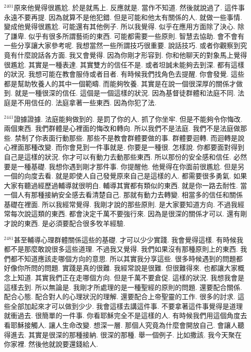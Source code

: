 \documentclass{book}
\begin{document}
$^{2401}$原來他覺得很尷尬.
於是就馬上.
反應就是.
當作不知道.
然後就說過了.
這件事永遠不要再提.
因為就算不是他犯錯.
但是可能和他太有關係的人.
就做一些事情.
變成他覺得很尷尬.
可能還有其他例子.
所以我覺得.
似乎在應用方面除了決心.
除了謙卑.
似乎有很多所謂藝術的東西.
可能都需要一些原則.
智慧去協助.
會不會有一些分享讓大家參考呢.
我想當然一些所謂技巧很重要.
說話技巧.
或者你觀察到究竟有什麼說話各方面.
我又會覺得.
因為你剛才形容到.
你和他聊天的對象馬上覺得很尷尬.
其實是一種表達.
其實雙方的信任不是.
或者坦誠未能夠去到深.
都有這樣的狀況.
我想可能在教會服侍或者目者.
有時候我們找角色去提醒.
你會發覺.
這些都是幫助牧養人的其中一個範疇.
而能夠牧養.
其實是在說一個很深厚的關係才做到.
就是一種很深的信任.
這個是一個這樣的狀況.
因為基督徒群體和法庭不同.
法庭是不用信任的.
法庭拿著一些東西.
因為你犯了法.

$^{2441}$證據證據.
法庭能夠做到的.
是罰了你的人.
抓了你坐牢.
但是不能夠令你悔改.
兩個東西.
我們群體是心裡面的悔改和轉向.
所以我們不是法庭.
我們不是法庭做那些.
禁制了你表面行動那些.
那些不是教會群體要做的事.
群體要迴轉.
而迴轉是說心裡面那種改變.
而你會見到一件事就是.
你要是一種很.
怎樣說.
你都要面對得到自己是這樣的狀況.
你才可以有動力去動那些東西.
所以那份的安全感和信任.
必然要是一種基礎.
我想你遇到剛才那件事.
你提醒他.
他覺得在你面前很尷尬.
但是另一個的向度去看.
就是即使人自己發覺原來自己是這樣的人.
都需要很多勇氣.
如果大家有聽過經歷過輔導就很明白.
輔導其實都有類似的東西.
就是你一路去耐性.
當一個人有那種接納安全感去看清楚自己.
那就有動力去轉變.
相當多的信任和關係基礎在裡面.
所以我經常覺得.
我剛才說的那些原則.
是大家要知道方向.
不過我經常每次說這類的東西.
都會決定千萬不要強行來.
因為是很深的關係才可以.
還有剛才說的東西.
是必須要配合很多牧羊經驗.

$^{2481}$甚至輔導心理群體關係這些的基礎.
才可以少少實踐.
我會覺得這樣.
有時候我都不是那麼敢說很多這些道理.
不過我又覺得.
我們如果沒有那種原則上的東西.
我們都不知道應該走哪個方向的意思.
所以其實我分享這些.
很多時候遇到的問題都好像你所問的問題.
實踐是真的很難.
我經常說是很難.
但很難得來.
也都讓大家概念上知道.
其實我們正在走哪個方向.
但是千萬不要倉促.
這樣的狀況.
我想我會是這樣去到.
所以無論是.
我剛才所處理的是一種聖經的原則的問題.
還要配合關係.
配合心態.
配合對人的心理狀況的理解.
還要配合上帝聖靈的工作.
很多的討求.
這些全部加起來才可以做到少少.
我會這樣去講這件事.
不要拿著這件事覺得是道理就衝過去.
很簡單的一件事.
你看耶穌完全不是這樣的人.
有時候我們用這個角度去看耶穌接觸人.
讓人生命改變.
想深一層.
那個人究竟為什麼會開放自己.
會讓人聽得進去.
其實是很深的那種接納.
很深的那種.
舉一個例子.
比如撒該.
我今天聚在你家裡.
然後他就說要還錢給人.
\end{document}
